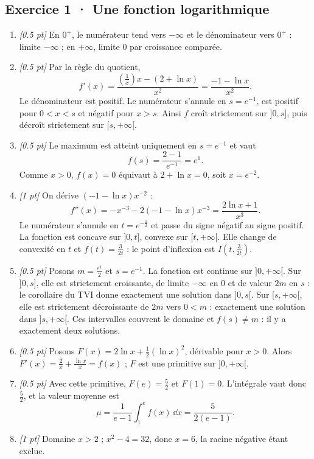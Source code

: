 \subsection*{Exercice 1 · Une fonction logarithmique}\begin{enumerate}

\item \textit{[\num{0,5} pt]} En $0^+$, le numérateur tend vers $-\infty$ et le dénominateur vers $0^+$ : limite $-\infty$ ; en $+\infty$, limite $0$ par croissance comparée.

\item \textit{[\num{0,5} pt]} Par la règle du quotient,
\[f'(x)=\frac{(\frac{1}{x})x-(2+\ln x)}{x^2}=\frac{-1-\ln x}{x^2}.\]
Le dénominateur est positif. Le numérateur s'annule en $s=e^{-1}$, est positif pour $0<x<s$ et négatif pour $x>s$. Ainsi $f$ croît strictement sur $]0,s]$, puis décroît strictement sur $[s,+\infty[$.

\item \textit{[\num{0,5} pt]} Le maximum est atteint uniquement en $s=e^{-1}$ et vaut
\[f(s)=\frac{2- 1}{e^{-1}}=e^{1}.\]
Comme $x>0$, $f(x)=0$ équivaut à $2+\ln x=0$, soit $x=e^{-2}$.

\item \textit{[1 pt]} On dérive $(-1-\ln x)x^{-2}$ :
\[f''(x)=-x^{-3}-2(-1-\ln x)x^{-3}=\frac{2\ln x+1}{x^3}.\]
Le numérateur s'annule en $t=e^{-\frac{1}{2}}$ et passe du signe négatif au signe positif. La fonction est concave sur $]0,t]$, convexe sur $[t,+\infty[$. Elle change de convexité en $t$ et $f(t)=\frac{3}{2t}$ : le point d'inflexion est $I(t,\frac{3}{2t})$.

\item \textit{[\num{0,5} pt]} Posons $m=\frac{e^{1}}{2}$ et $s=e^{-1}$. La fonction est continue sur $]0,+\infty[$. Sur $]0,s]$, elle est strictement croissante, de limite $-\infty$ en $0$ et de valeur $2m$ en $s$ : le corollaire du TVI donne exactement une solution dans $]0,s[$. Sur $[s,+\infty[$, elle est strictement décroissante de $2m$ vers $0<m$ : exactement une solution dans $]s,+\infty[$. Ces intervalles couvrent le domaine et $f(s)\ne m$ : il y a exactement deux solutions.

\item \textit{[\num{0,5} pt]} Posons $F(x)=2\ln x+\frac12(\ln x)^2$, dérivable pour $x>0$. Alors $F'(x)=\frac{2}{x}+\frac{\ln x}{x}=f(x)$ ; $F$ est une primitive sur $]0,+\infty[$.

\item \textit{[\num{0,5} pt]} Avec cette primitive, $F(e)=\frac{5}{2}$ et $F(1)=0$. L'intégrale vaut donc $\frac{5}{2}$, et la valeur moyenne est
\[\mu=\frac{1}{e-1}\int_1^e f(x)\,\dd x=\frac{5}{2(e-1)}.\]

\item \textit{[1 pt]} Domaine $x>2$ ; $x^2-4=32$, donc $x=6$, la racine négative étant exclue.

\end{enumerate}

